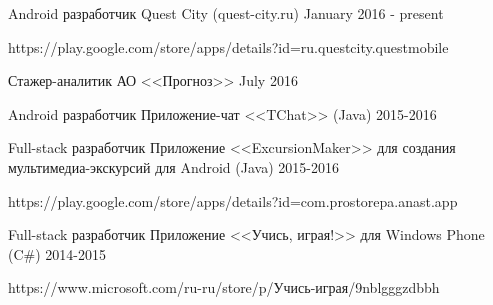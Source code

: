 


\begin{cventries}


\cventry
{Android разработчик} %
{Quest City (quest-city.ru)} %
{} %
{January 2016 - present} %
{ %
  \begin{cvitems}
\item {https://play.google.com/store/apps/details?id=ru.questcity.questmobile}
 \end{cvitems}
}


\cventry
{Стажер-аналитик} %
{АО <<Прогноз>>} %
{} %
{July 2016} %
{ %
}


\cventry
{Android разработчик} %
{Приложение-чат <<TChat>> (Java)} %
{} %
{2015-2016} %
{ %
}


\cventry
{Full-stack разработчик} %
{Приложение <<ExcursionMaker>> для создания мультимедиа-экскурсий для Android (Java) } %
{} %
{2015-2016} %
{ %
 \begin{cvitems}
\item {https://play.google.com/store/apps/details?id=com.prostorepa.anast.app}
 \end{cvitems}
}


\cventry
{Full-stack разработчик} %
{Приложение <<Учись, играя!>> для Windows Phone  (C\#) } %
{} %
{2014-2015} %
{ %
 \begin{cvitems}
\item {https://www.microsoft.com/ru-ru/store/p/Учись-играя/9nblgggzdbbh}
 \end{cvitems}
}

\end{cventries}